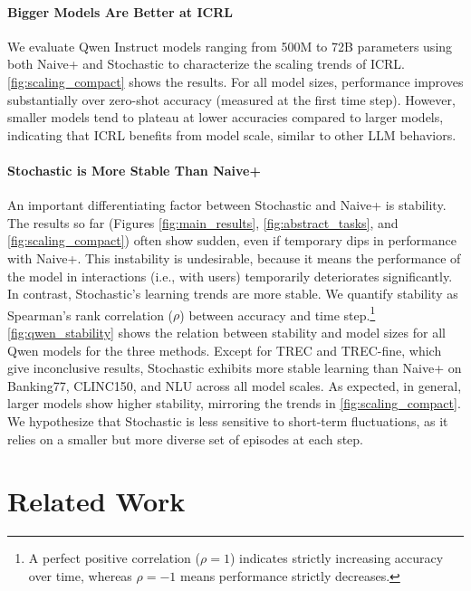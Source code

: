 \documentclass{article}
\theoremstyle{plain}
\theoremstyle{definition}
\theoremstyle{remark}
\newcommand{\qwen}{Qwen\xspace}
\newcommand{\banking}{Banking77\xspace}
\newcommand{\clinic}{CLINC150\xspace}
\newcommand{\trec}{TREC\xspace}
\newcommand{\trecfine}{TREC-fine\xspace}
\newcommand{\nlu}{NLU\xspace}
\newcommand{\naiveplusshort}{Naive+\xspace}
\newcommand{\expshort}{Stochastic\xspace}
\begin{document}
\paragraph{Bigger Models Are Better at ICRL}
We evaluate  \qwen Instruct models ranging from 500M to 72B parameters using both \naiveplusshort and \expshort to characterize the scaling trends of ICRL.
\autoref{fig:scaling_compact} shows the results.
For all model sizes, performance improves substantially over zero-shot accuracy (measured at the first time step).
However, smaller models tend to plateau at lower accuracies compared to larger models, indicating that ICRL benefits from model scale, similar to other LLM behaviors.
\paragraph{\expshort is More Stable Than \naiveplusshort}
An important differentiating factor between \expshort and \naiveplusshort is stability.
The results so far (Figures \ref{fig:main_results}, \ref{fig:abstract_tasks}, and \ref{fig:scaling_compact}) often show sudden, even if temporary dips in performance with \naiveplusshort.
This instability is undesirable, because it means the performance of the model in interactions (i.e., with users) temporarily deteriorates significantly.
In contrast, \expshort's learning trends are more stable.
We quantify stability as Spearman’s rank correlation ($\rho$) between accuracy and time step.\footnote{A perfect positive correlation ($\rho = 1$) indicates strictly increasing accuracy over time, whereas $\rho = -1$ means performance strictly decreases.}
\autoref{fig:qwen_stability} shows the relation between stability and model sizes for all \qwen models for the three methods.
Except for \trec and \trecfine, which give inconclusive results, \expshort exhibits more stable learning than \naiveplusshort on \banking, \clinic, and \nlu across all model scales.
As expected, in general, larger models show higher stability, mirroring the trends in \autoref{fig:scaling_compact}.
We hypothesize that \expshort is less sensitive to short-term fluctuations, as it relies on a smaller but more diverse set of episodes at each step.
\section{Related Work}\label{sec:related}
\end{document}
